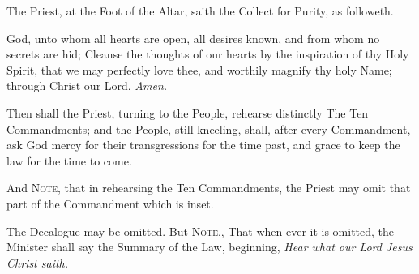 \begin{rubric}
    The Priest, at the Foot of the Altar, saith the Collect for Purity, as followeth.
\end{rubric}
 God, unto whom all hearts are open, all desires known, and from whom no secrets are hid; Cleanse the thoughts of our hearts by the inspiration of thy Holy Spirit, that we may perfectly love thee, and worthily magnify thy holy Name; through Christ our Lord. \textit{Amen.}
\begin{rubric}
Then shall the Priest, turning to the People, rehearse distinctly The Ten Commandments; and the People, still kneeling, shall, after every Commandment, ask God mercy for their transgressions for the time past, and grace to keep the law for the time to come.
\end{rubric}
\begin{rubric}
And \textsc{Note,} that in rehearsing the Ten Commandments, the Priest may omit that part of the Commandment which is inset.
\end{rubric}
\begin{rubric}
	The Decalogue may be omitted. But \textsc{Note,}, That when ever it is omitted, the Minister shall say the Summary of the Law, beginning, \emph{Hear what our Lord Jesus Christ saith.}
\end{rubric}
